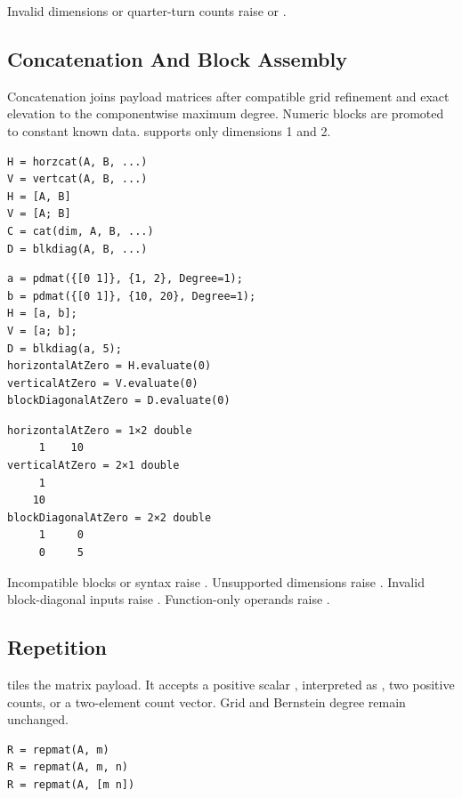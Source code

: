 Invalid dimensions or quarter-turn counts raise  or .

\subsection{Concatenation And Block Assembly}
\label{sec:pdmat-matrix-assembly}

Concatenation joins payload matrices after compatible grid refinement and exact elevation to the componentwise maximum degree. Numeric blocks are promoted to constant known data.  supports only dimensions 1 and 2.

\syntaxhead
\begin{lstlisting}[style=dpsyntax]
H = horzcat(A, B, ...)
V = vertcat(A, B, ...)
H = [A, B]
V = [A; B]
C = cat(dim, A, B, ...)
D = blkdiag(A, B, ...)
\end{lstlisting}

\examplehead
\begin{lstlisting}[style=dpmatlab]
a = pdmat({[0 1]}, {1, 2}, Degree=1);
b = pdmat({[0 1]}, {10, 20}, Degree=1);
H = [a, b];
V = [a; b];
D = blkdiag(a, 5);
horizontalAtZero = H.evaluate(0)
verticalAtZero = V.evaluate(0)
blockDiagonalAtZero = D.evaluate(0)
\end{lstlisting}

\begin{lstlisting}[style=dpoutput]
horizontalAtZero = 1×2 double
     1    10
verticalAtZero = 2×1 double
     1
    10
blockDiagonalAtZero = 2×2 double
     1     0
     0     5
\end{lstlisting}

Incompatible blocks or syntax raise . Unsupported dimensions raise . Invalid block-diagonal inputs raise .  Function-only operands raise .

\subsection{Repetition}

 tiles the matrix payload.  It accepts a positive scalar , interpreted as \code{[m m]}, two positive counts, or a two-element count vector.  Grid and Bernstein degree remain unchanged.

\syntaxhead
\begin{lstlisting}[style=dpsyntax]
R = repmat(A, m)
R = repmat(A, m, n)
R = repmat(A, [m n])
\end{lstlisting}


